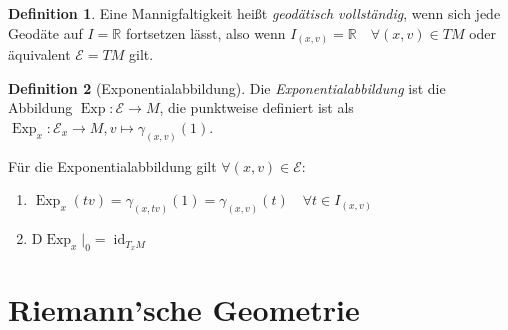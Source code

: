 \documentclass[a4paper]{scrreprt}
\numberwithin{equation}{chapter}
\newcommand{\DD}{\mathrm{D}}
\DeclareMathOperator{\id}{id}
\DeclareMathOperator{\Exp}{Exp}
\newcommand{\R}{\mathbb{R}}
\theoremstyle{definition}
\newtheorem{defn}{Definition}[section]
\begin{document}
		\begin{defn}
			Eine Mannigfaltigkeit heißt \emph{geodätisch vollständig}, wenn sich jede Geodäte auf $I=\R$ fortsetzen lässt, also wenn $I_{(x,v)}=\R\quad\forall (x,v)\in TM$ oder äquivalent $\mathcal{E}=TM$ gilt.
		\end{defn}
		\begin{defn}[Exponentialabbildung]
			Die \emph{Exponentialabbildung} ist die Abbildung $\Exp\colon \mathcal{E}\rightarrow M$, die punktweise definiert ist als $\Exp_x\colon \mathcal{E}_x\rightarrow M, v\mapsto \gamma_{(x,v)}(1)$.
			
			Für die Exponentialabbildung gilt $\forall(x,v)\in \mathcal{E}$:
			\begin{enumerate}[label=\arabic* .]
				\item $\Exp_x(tv)=\gamma_{(x,tv)}(1)=\gamma_{(x,v)}(t) \quad\forall t\in I_{(x,v)}$
				\item $\DD\Exp_x\vert_0=\id_{T_xM}$
			\end{enumerate}
		\end{defn}
		
		

\chapter{Riemann'sche Geometrie}
\end{document}
